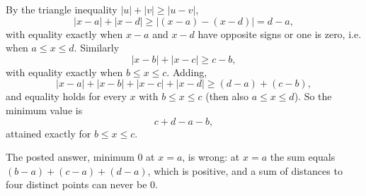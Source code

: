 By the triangle inequality $|u|+|v|\ge|u-v|$,
\[
|x-a|+|x-d|\ge|(x-a)-(x-d)|=d-a,
\]
with equality exactly when $x-a$ and $x-d$ have opposite signs or one is zero, i.e. when $a\le x\le d$. Similarly
\[
|x-b|+|x-c|\ge c-b,
\]
with equality exactly when $b\le x\le c$. Adding,
\[
|x-a|+|x-b|+|x-c|+|x-d|\ge (d-a)+(c-b),
\]
and equality holds for every $x$ with $b\le x\le c$ (then also $a\le x\le d$). So the minimum value is
\[
\boxed{c+d-a-b},
\]
attained exactly for $b\le x\le c$.

The posted answer, minimum $0$ at $x=a$, is wrong: at $x=a$ the sum equals $(b-a)+(c-a)+(d-a)$, which is positive, and a sum of distances to four distinct points can never be $0$.
